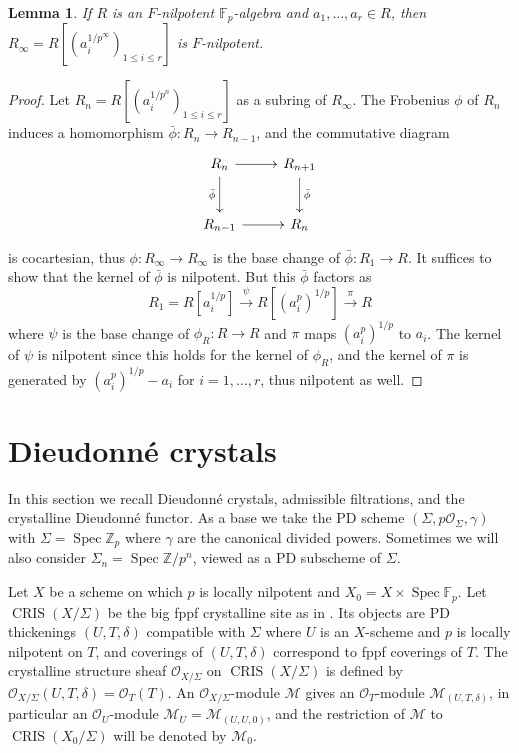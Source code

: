 \documentclass[a4paper,11pt]{article}
\theoremstyle{plain}
\newtheorem{Lemma}{Lemma}
\theoremstyle{definition}
\theoremstyle{remark}
\theoremstyle{definition}
\numberwithin{Lemma}{section}
\numberwithin{Subpoint}{Lemma}
\numberwithin{equation}{section}
\newcommand{\MMM}{\mathcal{M}}
\newcommand{\OOO}{\mathcal{O}}
\newcommand{\FF}{{\mathbb{F}}}
\newcommand{\ZZ}{{\mathbb{Z}}}
\DeclareMathOperator{\CRIS}{CRIS}
\DeclareMathOperator{\Spec}{Spec}
\begin{document}
\begin{Lemma}
\label{Le:Fnil-remains}
If $R$ is an $F$-nilpotent\/ $\FF_p$-algebra and $a_1,\ldots,a_r\in R$,
then $R_\infty=R[(a_i^{1/p^\infty})_{1\le i\le r}]$ is $F$-nilpotent.
\end{Lemma}

\begin{proof}
Let $R_n=R[(a_i^{1/p^n})_{1\le i\le r}]$ as a subring of $R_\infty$.
The Frobenius $\phi$ of $R_n$ 
induces a homomorphism $\bar\phi:R_n\to R_{n-1}$,
and the commutative diagram
\[
\xymatrix@M+0.2em{
R_n \ar[r] \ar[d]_{\bar\phi} &
R_{n+1} \ar[d]^{\bar\phi} \\
R_{n-1} \ar[r] & R_n
}
\]
is cocartesian, 
thus $\phi:R_\infty\to R_\infty$
is the base change of $\bar\phi:R_1\to R$.
It suffices to show that the kernel of $\bar\phi$ is nilpotent.
But this $\bar\phi$ factors as
\[
R_1=R[a_i^{1/p}]\xrightarrow \psi R[(a_i^p)^{1/p}]\xrightarrow \pi R
\]
where $\psi$ is the base change of $\phi_R:R\to R$ and $\pi$
maps $(a_i^p)^{1/p}$ to $a_i$. 
The kernel of $\psi$ is nilpotent since this holds for the
kernel of $\phi_R$,
and the kernel of $\pi$
is generated by $(a_i^p)^{1/p}-a_i$ for $i=1,\ldots,r$,
thus nilpotent as well.
\end{proof}

\section{Dieudonn\'e crystals}

\label{Se:DC}

In this section we recall Dieudonn\'e crystals,
admissible filtrations, and the crystalline Dieudonn\'e functor.
As a base we take the PD scheme 
$(\Sigma,p\OOO_{\Sigma},\gamma)$ with $\Sigma=\Spec\ZZ_p$
where $\gamma$ are the canonical divided powers.
Sometimes we will also consider $\Sigma_n=\Spec\ZZ/p^n$,
viewed as a PD subscheme of $\Sigma$.

Let $X$ be a scheme on which $p$ is locally nilpotent and 
$X_0=X\times\Spec\FF_p$.
Let $\CRIS(X/\Sigma)$ be the big fppf crystalline site as in \cite{BBM}. 
Its objects are PD thickenings $(U,T,\delta)$ compatible with $\Sigma$
where $U$ is an $X$-scheme and $p$ is locally nilpotent on $T$,
and coverings of $(U,T,\delta)$ correspond to fppf coverings of $T$. 
The crystalline structure sheaf $\OOO_{X/\Sigma}$ 
on $\CRIS(X/\Sigma)$ is defined by 
$\OOO_{X/\Sigma}(U,T,\delta)=\OOO_T(T)$.
An $\OOO_{X/\Sigma}$-module $\MMM$
gives an $\OOO_T$-module $\MMM_{(U,T,\delta)}$,
in particular an $\OOO_U$-module $\MMM_{U}=\MMM_{(U,U,0)}$,
and the restriction of $\MMM$ to $\CRIS(X_0/\Sigma)$
will be denoted by $\MMM_0$.
\end{document}
